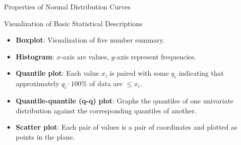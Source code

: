 \begin{frame}{Properties of Normal Distribution Curves}
  \hspace{0.2cm}
\end{frame}

\begin{frame}{Visualization of Basic Statistical Descriptions}
  \begin{itemize}
  \item \textbf{Boxplot}: Visualization of five number summary.
  \item \textbf{Histogram}: $x$-axis are values, $y$-axis represent frequencies.
  \item \textbf{Quantile plot}: Each value $x_i$ is paired with some $q_i$ indicating that approximately $q_i \cdot 100 \%$ of data are $\leq x_i$.
  \item \textbf{Quantile-quantile (q-q) plot}: Graphs the quantiles of one univariate distribution against the corresponding quantiles of another.
  \item \textbf{Scatter plot}: Each pair of values is a pair of coordinates and plotted as points in the plane.
  \end{itemize}
\end{frame}

